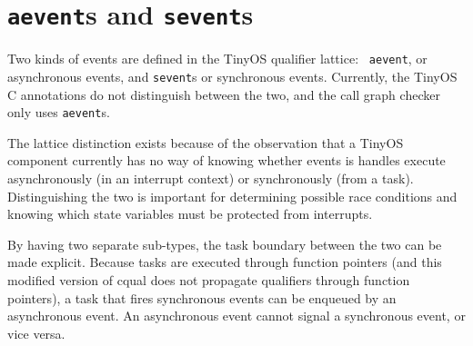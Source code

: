 \documentclass[12pt]{article}
\begin{document}
\section*{{\tt aevent}s and {\tt sevent}s}
Two kinds of events are defined in the TinyOS qualifier lattice: {\tt
aevent}, or asynchronous events, and {\tt sevent}s or synchronous
events. Currently, the TinyOS C annotations do not distinguish between
the two, and the call graph checker only uses {\tt aevent}s.

The lattice distinction exists because of the observation that a
TinyOS component currently has no way of knowing whether events is
handles execute asynchronously (in an interrupt context) or
synchronously (from a task). Distinguishing the two is important for
determining possible race conditions and knowing which state variables
must be protected from interrupts.

By having two separate sub-types, the task boundary between the two
can be made explicit. Because tasks are executed through function
pointers (and this modified version of cqual does not propagate
qualifiers through function pointers), a task that fires synchronous
events can be enqueued by an asynchronous event. An asynchronous event
cannot signal a synchronous event, or vice versa.
\end{document}
